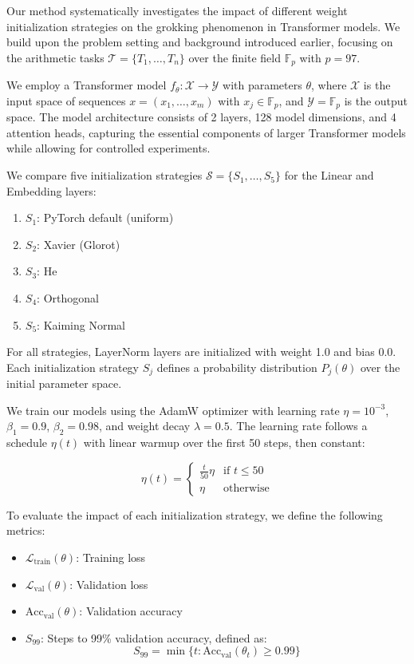 \documentclass{article} %
\begin{document}
Our method systematically investigates the impact of different weight initialization strategies on the grokking phenomenon in Transformer models. We build upon the problem setting and background introduced earlier, focusing on the arithmetic tasks $\mathcal{T} = \{T_1, \ldots, T_n\}$ over the finite field $\mathbb{F}_p$ with $p = 97$.

We employ a Transformer model $f_\theta: \mathcal{X} \rightarrow \mathcal{Y}$ with parameters $\theta$, where $\mathcal{X}$ is the input space of sequences $x = (x_1, \ldots, x_m)$ with $x_j \in \mathbb{F}_p$, and $\mathcal{Y} = \mathbb{F}_p$ is the output space. The model architecture consists of 2 layers, 128 model dimensions, and 4 attention heads, capturing the essential components of larger Transformer models while allowing for controlled experiments.

We compare five initialization strategies $\mathcal{S} = \{S_1, \ldots, S_5\}$ for the Linear and Embedding layers:

\begin{enumerate}
    \item $S_1$: PyTorch default (uniform)
    \item $S_2$: Xavier (Glorot)
    \item $S_3$: He
    \item $S_4$: Orthogonal
    \item $S_5$: Kaiming Normal
\end{enumerate}

For all strategies, LayerNorm layers are initialized with weight 1.0 and bias 0.0. Each initialization strategy $S_j$ defines a probability distribution $P_j(\theta)$ over the initial parameter space.

We train our models using the AdamW optimizer with learning rate $\eta = 10^{-3}$, $\beta_1 = 0.9$, $\beta_2 = 0.98$, and weight decay $\lambda = 0.5$. The learning rate follows a schedule $\eta(t)$ with linear warmup over the first 50 steps, then constant:

\[
\eta(t) = \begin{cases}
    \frac{t}{50}\eta & \text{if } t \leq 50 \\
    \eta & \text{otherwise}
\end{cases}
\]

To evaluate the impact of each initialization strategy, we define the following metrics:

\begin{itemize}
    \item $\mathcal{L}_{\text{train}}(\theta)$: Training loss
    \item $\mathcal{L}_{\text{val}}(\theta)$: Validation loss
    \item $\text{Acc}_{\text{val}}(\theta)$: Validation accuracy
    \item $S_{99}$: Steps to 99\% validation accuracy, defined as:
    \[
    S_{99} = \min\{t : \text{Acc}_{\text{val}}(\theta_t) \geq 0.99\}
    \]
\end{itemize}
\end{document}
